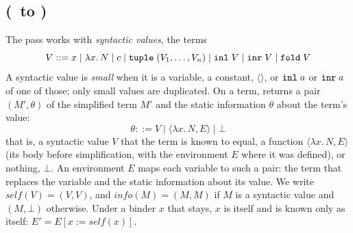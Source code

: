 \subsection{ (\fpc\ to \fpc)}
\label{app:pass-simplify}

The pass works with \emph{syntactic values}, the terms
\[
  V ::= x \mid \lambda x.\, N \mid c \mid \mathtt{tuple}\;(V_1, \ldots, V_n)
    \mid \mathtt{inl}\;V \mid \mathtt{inr}\;V \mid \mathtt{fold}\;V
\]
A syntactic value is \emph{small} when it is a variable, a constant,
$\langle\rangle$, or $\mathtt{inl}\;a$ or $\mathtt{inr}\;a$ of one of those;
only small values are duplicated. On a term,  returns a
pair $(M', \theta)$ of the simplified term $M'$ and the static information
$\theta$ about the term's value:
\[
  \theta ::= V \mid \langle \lambda x.\, N, E \rangle \mid \bot
\]
that is, a syntactic value $V$ that the term is known to
equal, a function $\langle \lambda x.\, N, E \rangle$ (its body before
simplification, with the environment $E$ where it was defined), or nothing,
$\bot$. An environment $E$ maps each variable to such a pair: the term
that replaces the variable and the static information about its value. We
write $\mathit{self}(V) = (V, V)$, and $\mathit{info}(M) = (M, M)$ if $M$ is a syntactic value and $(M, \bot)$ otherwise. Under a binder $x$
that stays, $x$ is itself and is known only as itself:
$E' = E[x{:=}\mathit{self}(x)]$.


